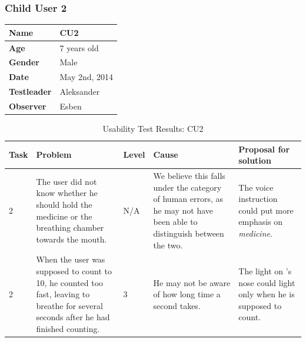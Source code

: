 \subsubsection{Child User 2}
\begin{table}[H]
\centering
\begin{tabular}{| p{4.0cm} | p{4.0cm} |}
\hline
 \textbf{Name} & CU2 \\
 \hline
 \textbf{Age} & 7 years old \\
 \hline 
 \textbf{Gender} & Male \\
 \hline
 \textbf{Date} & May 2nd, 2014 \\
 \hline
 \textbf{Testleader} & Aleksander \\
 \hline
 \textbf{Observer} & Esben \\
 \hline
\end{tabular}
\end{table}

\begin{table}[H]
\centering
\begin{tabular}{| p{1.0cm} | p{4.0cm} | p{0.9cm} | p{3.1cm} | p{3.7cm} |}
\hline
	\textbf{Task} & \textbf{Problem} & \textbf{Level} & \textbf{Cause} & \textbf{Proposal for solution} \\
	\hline
	2 & The user did not know whether he should hold the medicine or the breathing chamber towards the mouth. & N/A & We believe this falls under the category of human errors, as he may not have been able to distinguish between the two. & The voice instruction could put more emphasis on \emph{medicine}. \\
	\hline
	2 & When the user was supposed to count to 10, he counted too fast, leaving \ab{} to breathe for several seconds after he had finished counting. & 3 & He may not be aware of how long time a second takes. & The light on \ab{}'s nose could light only when he is supposed to count. \\
	\hline
\end{tabular}
\caption{Usability Test Results: CU2}
\label{tab:testchild2}
\end{table}

\clearpage{}

